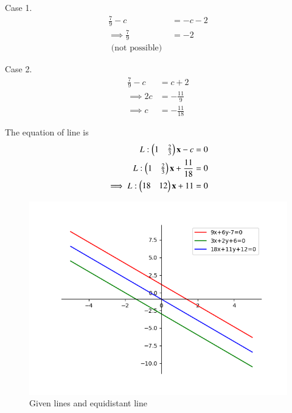 \documentclass[journal,12pt,twocolumn]{IEEEtran}
\renewcommand{\vec}[1]{\boldsymbol{\mathbf{#1}}}
\begin{document}
Case 1.
\begin{align}
	\frac{7}{9} - {c} &= -{c} - 2\\
    \implies \frac{7}{9} &= -2\\
    \text{ (not possible) } 
\end{align}

Case 2.
\begin{align}
    \frac{7}{9} - {c} &= {c} + 2\\
    \implies 2{c} &= -\frac{11}{9}\\
    \implies {c} &= -\frac{11}{18}
\end{align}

The equation of line is
\begin{align}
    {L}: \myvec{1&\frac{2}{3}}\vec{x} - c &= 0\\
    {L}: \myvec{1&\frac{2}{3}}\vec{x} +  \frac{11}{18}&= 0\\
    \implies {L}: \myvec{18&12}\vec{x} + 11 &= 0\\
\end{align}

\begin{figure}[!htb]
    \centering
    \includegraphics[width=\columnwidth]{figs/line.png}
    \caption{Given lines and equidistant line}
    \label{fig:line}
\end{figure}
\end{document}
